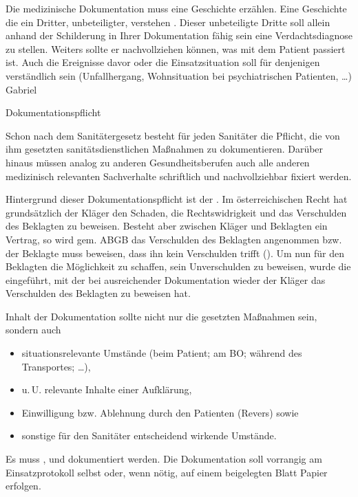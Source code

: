  {Die medizinische Dokumentation
muss eine Geschichte erzählen. Eine Geschichte die ein
Dritter, unbeteiligter, verstehen . Dieser
unbeteiligte Dritte soll allein anhand der
Schilderung in Ihrer Dokumentation fähig sein eine
Verdachtsdiagnose zu stellen. Weiters sollte er
nachvollziehen können, was mit dem Patient passiert ist.
Auch die Ereignisse davor oder die Einsatzsituation soll
für denjenigen verständlich sein (Unfallhergang,
Wohnsituation bei psychiatrischen Patienten, \ldots)
}{
}
{}
{}
{Gabriel}

\bigskip



{Dokumentationspflicht}
{\label{topic:dokumentationspflicht}%
\label{topic:dokumentation-rechtlich}%
Schon nach dem Sanitätergesetz besteht für jeden Sanitäter
die Pflicht, die von ihm gesetzten
sanitätsdienstlichen Maßnahmen zu
dokumentieren. Darüber hinaus müssen
analog zu anderen Gesundheitsberufen auch alle anderen
medizinisch relevanten Sachverhalte schriftlich und
nachvollziehbar fixiert werden.

Hintergrund dieser Dokumentationspflicht ist der
.
Im österreichischen Recht hat grundsätzlich der Kläger den
Schaden, die Rechtswidrigkeit und das Verschulden des
Beklagten zu beweisen. Besteht aber zwischen Kläger und
Beklagten ein Vertrag, so wird gem.  ABGB das
Verschulden des Beklagten angenommen bzw. der Beklagte muss
beweisen, dass ihn kein Verschulden trifft
().
Um nun für den Beklagten die Möglichkeit zu schaffen, sein
Unverschulden zu beweisen, wurde die
 eingeführt, mit der bei
ausreichender Dokumentation wieder der Kläger das
Verschulden des Beklagten zu beweisen hat.


Inhalt der Dokumentation sollte nicht nur die 
gesetzten Maßnahmen sein, sondern auch 
\begin{itemize}
  \item situationsrelevante
  Umstände (beim Patient; am BO; während des Transportes;
  {\dots}),
  \item  u.\,U. relevante Inhalte einer Aufklärung,
  \item Einwilligung bzw. Ablehnung durch den Patienten
  (Revers) sowie
  \item sonstige für den Sanitäter entscheidend wirkende
  Umstände.
\end{itemize}



Es muss ,  und
 dokumentiert werden.
Die Dokumentation soll vorrangig am Einsatzprotokoll selbst
oder, wenn nötig, auf einem beigelegten
Blatt Papier erfolgen.
}
{}
{}
{}
{}


